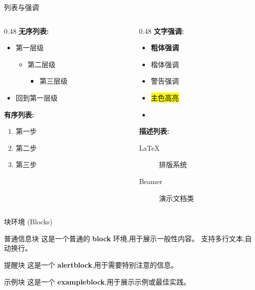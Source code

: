 \documentclass[aspectratio=169, 10pt, UTF8]{ctexbeamer}
\begin{document}
\begin{frame}{列表与强调}
  \begin{columns}[T]
    \begin{column}{0.48\textwidth}
      \textbf{无序列表:}
      \begin{itemize}
        \item 第一层级
        \begin{itemize}
          \item 第二层级
          \begin{itemize}
            \item 第三层级
          \end{itemize}
        \end{itemize}
        \item 回到第一层级
      \end{itemize}
      \vspace{0.5em}
      \textbf{有序列表:}
      \begin{enumerate}
        \item 第一步
        \item 第二步
        \item 第三步
      \end{enumerate}
    \end{column}
    \begin{column}{0.48\textwidth}
      \textbf{文字强调:}
      \begin{itemize}
        \item \textbf{粗体强调}
        \item {\kaishu 楷体强调}
        \item \alert{警告强调}
        \item \hl{主色高亮}
        \item {}
      \end{itemize}
      \vspace{0.5em}
      \textbf{描述列表:}
      \begin{description}
        \item[\LaTeX] 排版系统
        \item[Beamer] 演示文档类
      \end{description}
    \end{column}
  \end{columns}
\end{frame}

\begin{frame}{块环境 (Blocks)}
  \begin{block}{普通信息块}
    这是一个普通的 \textbf{block} 环境,用于展示一般性内容。
    支持多行文本,自动换行。
  \end{block}

  \begin{alertblock}{提醒块}
    这是一个 \textbf{alertblock},用于需要特别注意的信息。
  \end{alertblock}

  \begin{exampleblock}{示例块}
    这是一个 \textbf{exampleblock},用于展示示例或最佳实践。
  \end{exampleblock}
\end{frame}
\end{document}
